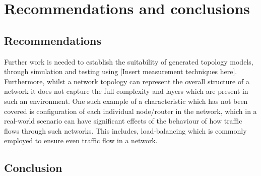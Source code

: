 \section{Recommendations and conclusions}

\subsection{Recommendations}
Further work is needed to establish the suitability of generated topology models, through simulation and testing using [Insert measurement techniques here]. Furthermore, whilst a network topology can represent the overall structure of a network it does not capture the full complexity and layers which are present in such an environment. One such example of a characteristic which has not been covered is configuration of each individual node/router in the network, which in a real-world scenario can have significant effects of the behaviour of how traffic flows through such networks. This includes, load-balancing which is commonly employed to ensure even traffic flow in a network. 








\subsection{Conclusion}
